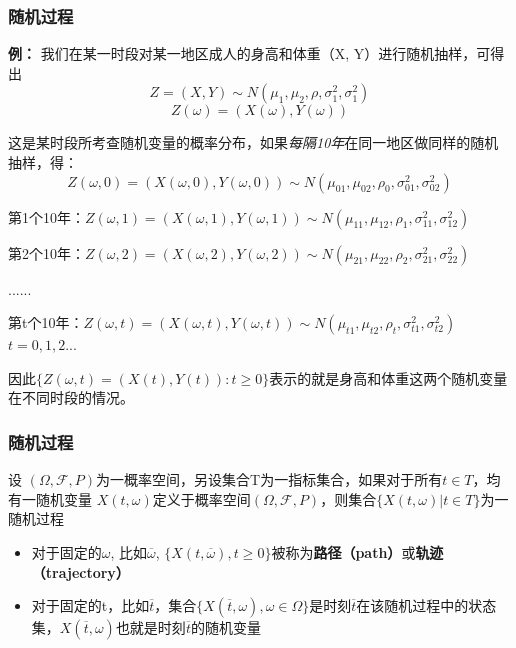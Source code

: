 \documentclass{beamer}
\begin{document}
\begin{frame}

\frametitle{随机过程}
\small

\textbf{例：} 我们在某一时段对某一地区成人的身高和体重（X, Y）进行随机抽样，可得出 
$$Z = (X,Y) \sim N(\mu_1,\mu_2,\rho,\sigma^2_1,\sigma^2_1)$$
$$Z(\omega) = (X(\omega),Y(\omega))$$

这是某时段所考查随机变量的概率分布，如果\textit{每隔10年}在同一地区做同样的随机抽样，得： \\
$$Z(\omega,0)=(X(\omega,0),Y(\omega,0)) \sim N(\mu_{01},\mu_{02},\rho_0,\sigma^2_{01},\sigma^2_{02})$$

第1个10年：$Z(\omega,1)=(X(\omega,1),Y(\omega,1)) \sim N(\mu_{11},\mu_{12},\rho_1,\sigma^2_{11},\sigma^2_{12})$

第2个10年：$Z(\omega,2)=(X(\omega,2),Y(\omega,2)) \sim N(\mu_{21},\mu_{22},\rho_2,\sigma^2_{21},\sigma^2_{22})$

......

第t个10年：$Z(\omega,t)=(X(\omega,t),Y(\omega,t)) \sim N(\mu_{t1},\mu_{t2},\rho_t,\sigma^2_{t1},\sigma^2_{t2})$ $t = 0,1,2...$

因此$\{Z(\omega,t)=(X(t),Y(t)): t \geq 0\}$表示的就是身高和体重这两个随机变量在不同时段的情况。


\end{frame}


\begin{frame}

\frametitle{随机过程}

\begin{definition}[随机过程]

设 $(\Omega ,{\mathcal  {F}},P)$为一概率空间，另设集合T为一指标集合，如果对于所有$t\in T$，均有一随机变量 $X(t,\omega)$定义于概率空间$(\Omega ,{\mathcal  {F}},P)$，则集合$\{X(t,\omega)|t\in T\}$为一随机过程

\begin{itemize}

\item 对于固定的$\omega$, 比如$\overline{\omega}$, $\{X(t,\overline{\omega}), t \geq 0\}$被称为\textbf{路径（path）}或\textbf{轨迹（trajectory）}

\item 对于固定的t，比如$\overline{t}$，集合$\{X(\overline{t},\omega), \omega \in \Omega\}$是时刻$\overline{t}$在该随机过程中的状态集，$X(\overline{t},\omega)$也就是时刻$\overline{t}$的随机变量


\end{itemize}

\end{definition}

\end{frame}
\end{document}
